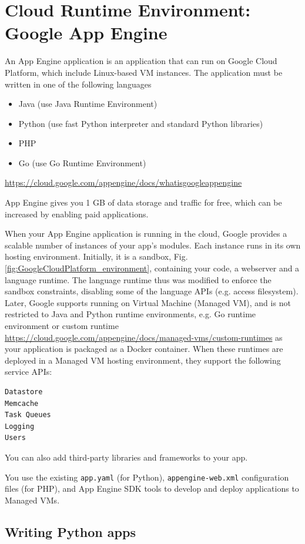 \chapter{Cloud Runtime Environment: Google App Engine}
\label{chap:AppEngine}

An App Engine application is an application that can run on Google Cloud
Platform, which include Linux-based VM instances. The application must be
written in one of the following languages
\begin{itemize}
  \item Java (use Java Runtime Environment)
  \item Python (use fast Python interpreter and standard Python libraries)
  \item PHP
  \item Go (use Go Runtime Environment)
\end{itemize}
\url{https://cloud.google.com/appengine/docs/whatisgoogleappengine}

App Engine gives you 1 GB of data storage and traffic for free, which can be
increased by enabling paid applications.

When your App Engine application is running in the cloud, Google provides a
scalable number of instances of your app's modules. Each instance runs in its
own hosting environment. Initially, it is a sandbox,
Fig.\ref{fig:GoogleCloudPlatform_environment}, containing your code, a webserver
and a language runtime. The language runtime thus was modified to enforce the
sandbox constraints, disabling some of the language APIs (e.g. access
filesystem). Later, Google supports running on Virtual Machine (Managed VM), and
is not restricted to Java and Python runtime environments, e.g. Go runtime
environment or custom runtime
\url{https://cloud.google.com/appengine/docs/managed-vms/custom-runtimes} as
your application is packaged as a Docker container.
When these runtimes are deployed in a Managed VM hosting environment, they support the following service APIs:
\begin{verbatim}
Datastore
Memcache 
Task Queues
Logging
Users
\end{verbatim}

You can also add third-party libraries and frameworks to your app.

You use the existing \verb!app.yaml! (for Python), \verb!appengine-web.xml!
configuration files (for PHP), and App Engine SDK tools to develop and deploy
applications to Managed VMs.

\section{Writing Python apps}


